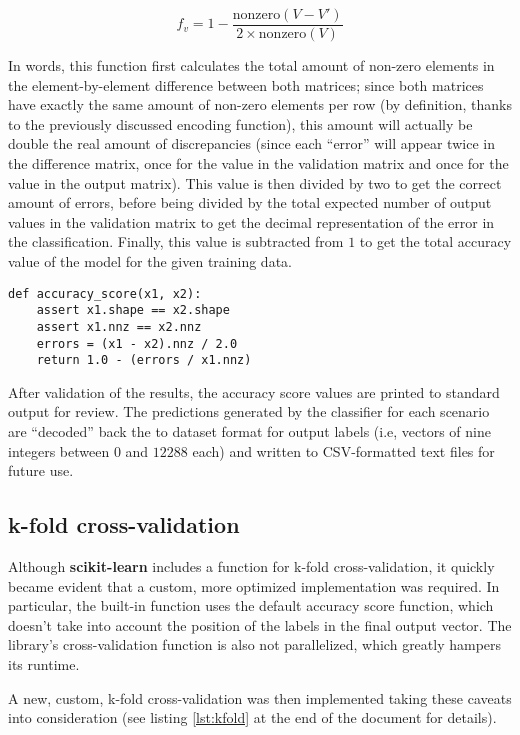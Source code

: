 \documentclass{kthreport}
\theoremstyle{definition}
\begin{document}
\[ f_{v} = 1 - \frac{\text{nonzero}(V - V')}{2 \times \text{nonzero}(V)} \]

In words, this function first calculates the total amount of non-zero elements in the element-by-element difference between both matrices; since both matrices have exactly the same amount of non-zero elements per row (by definition, thanks to the previously discussed encoding function), this amount will actually be double the real amount of discrepancies (since each ``error'' will appear twice in the difference matrix, once for the value in the validation matrix and once for the value in the output matrix).
This value is then divided by two to get the correct amount of errors, before being divided by the total expected number of output values in the validation matrix to get the decimal representation of the error in the classification.
Finally, this value is subtracted from $1$ to get the total accuracy value of the model for the given training data. 

\begin{lstlisting}[style=MyPython, caption={Accuracy score function implemented in Python}]
def accuracy_score(x1, x2):
	assert x1.shape == x2.shape
	assert x1.nnz == x2.nnz
	errors = (x1 - x2).nnz / 2.0
	return 1.0 - (errors / x1.nnz)
\end{lstlisting}

After validation of the results, the accuracy score values are printed to standard output for review. 
The predictions generated by the classifier for each scenario are ``decoded'' back the to dataset format for output labels (i.e, vectors of nine integers between $0$ and $12 288$ each) and written to CSV-formatted text files for future use.

\subsection{k-fold cross-validation}

Although \textbf{scikit-learn} includes a function for k-fold cross-validation, it quickly became evident that a custom, more optimized implementation was required. 
In particular, the built-in function uses the default accuracy score function, which doesn't take into account the position of the labels in the final output vector. The library's cross-validation function is also not parallelized, which greatly hampers its runtime.

A new, custom, k-fold cross-validation was then implemented taking these caveats into consideration (see listing \ref{lst:kfold} at the end of the document for details).
\end{document}
